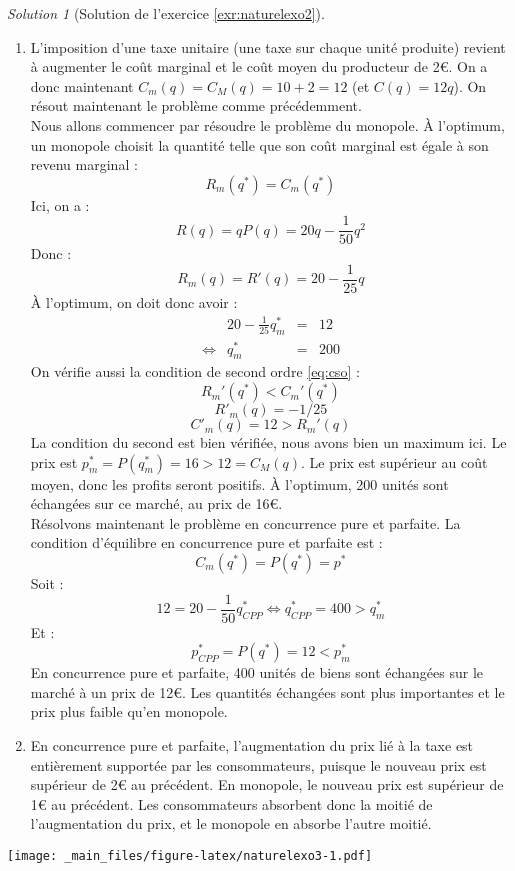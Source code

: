 \documentclass[
]{book}
\theoremstyle{definition}
\theoremstyle{definition}
\theoremstyle{definition}
\theoremstyle{definition}
\theoremstyle{remark}
\newtheorem*{solution}{Solution}
\begin{document}
\begin{solution}[Solution de l'exercice \ref{exr:naturelexo2}]
\begin{enumerate}
  On obtient bien les mêmes résultats qu'en utilisant la demande inverse.
  Dans cette exercice, on a néanmoins besoin de la demande inverse pour le monopole, s'en passer n'est donc pas possible.
\item
  L'imposition d'une taxe unitaire (une taxe sur chaque unité produite) revient à augmenter le coût marginal et le coût moyen du producteur de 2€.
  On a donc maintenant \(C_m(q)=C_M(q)=10+2=12\) (et \(C(q)=12q\)).
  On résout maintenant le problème comme précédemment.\\
  Nous allons commencer par résoudre le problème du monopole.
  À l'optimum, un monopole choisit la quantité telle que son coût marginal est égale à son revenu marginal :
  \[R_m(q^*)=C_m(q^*)\]
  Ici, on a :
  \[R(q) =qP(q)=20q-\frac{1}{50}q^2\]
  Donc :
  \[R_m(q)=R'(q)=20-\frac{1}{25}q\]
  À l'optimum, on doit donc avoir :
  \[
  \begin{array}{crcl}
  &20-\frac{1}{25}q^*_m&=&12\\
  \Leftrightarrow & q^*_m&=&200
  \end{array}
  \]
  On vérifie aussi la condition de second ordre \eqref{eq:cso} :
  \[R_m'(q^*)<C_m'(q^*)\]
  \[R'_m(q)=-1/25\]
  \[C'_m(q)=12>R_m'(q)\]
  La condition du second est bien vérifiée, nous avons bien un maximum ici.
  Le prix est \(p^*_m=P(q^*_m)=16>12=C_M(q)\).
  Le prix est supérieur au coût moyen, donc les profits seront positifs.
  À l'optimum, 200 unités sont échangées sur ce marché, au prix de 16€.\\
  Résolvons maintenant le problème en concurrence pure et parfaite.
  La condition d'équilibre en concurrence pure et parfaite est :
  \[C_m(q^*)=P(q^*)=p^*\]
  Soit :
  \[12=20-\frac{1}{50}q^*_{CPP}\Leftrightarrow q^*_{CPP}=400>q_m^*\]
  Et :
  \[p^*_{CPP}=P(q^*)=12<p_m^*\]
  En concurrence pure et parfaite, 400 unités de biens sont échangées sur le marché à un prix de 12€.
  Les quantités échangées sont plus importantes et le prix plus faible qu'en monopole.
\item
  En concurrence pure et parfaite, l'augmentation du prix lié à la taxe est entièrement supportée par les consommateurs, puisque le nouveau prix est supérieur de 2€ au précédent.
  En monopole, le nouveau prix est supérieur de 1€ au précédent.
  Les consommateurs absorbent donc la moitié de l'augmentation du prix, et le monopole en absorbe l'autre moitié.
\end{enumerate}

\texttt{[image: \_main\_files/figure-latex/naturelexo3-1.pdf]}
\end{solution}
\end{document}
